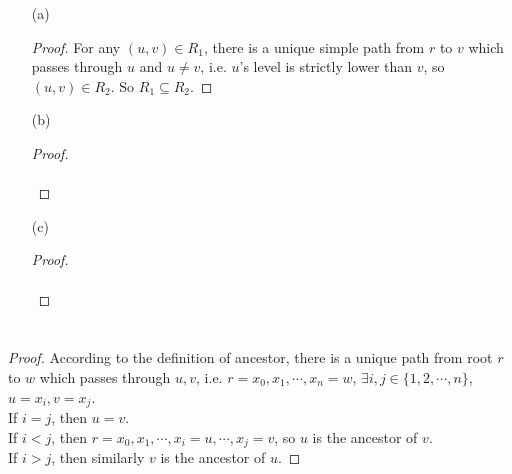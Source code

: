\documentclass{article}
\begin{document}
\begin{itemize}
    \item [(a)] \begin{proof}
        For any $(u, v) \in R_1$, there is a unique simple path from $r$ to $v$ which passes through $u$ and $u \neq v$, i.e. $u$'s level is strictly lower than $v$, so $(u, v) \in R_2$. So $R_1 \subseteq R_2$.
    \end{proof}
    \item [(b)] \begin{proof}\quad\\ \quad \\
    \end{proof}
    \item [(c)] \begin{proof} \quad \\ \quad \\
    \end{proof}
\end{itemize}

\section{}

\begin{proof}
    According to the definition of ancestor, there is a unique path from root $r$ to $w$ which passes through $u, v$, i.e. $r = x_0, x_1, \cdots, x_n = w$, $\exists i, j \in \{1, 2, \cdots, n\}$, $u = x_i, v = x_j$.\\
    If $i = j$, then $u = v$.\\
    If $i < j$, then $r = x_0, x_1, \cdots, x_i = u, \cdots, x_j = v$, so $u$ is the ancestor of $v$. \\
    If $i > j$, then similarly $v$ is the ancestor of $u$.
\end{proof}
\end{document}
